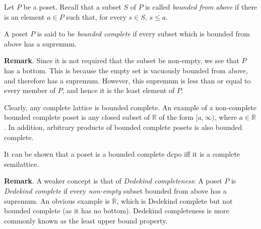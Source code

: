 \documentclass[12pt]{article}
\begin{document}
Let $P$ be a poset.  Recall that a subset $S$ of $P$ is called \emph{bounded from above} if there is an element $a\in P$ such that, for every $s\in S$, $s\le a$.

A poset $P$ is said to be \emph{bounded complete} if every subset which is bounded from above has a supremum.

\textbf{Remark}.  Since it is not required that the subset be non-empty, we see that $P$ has a bottom.  This is because the empty set is vacuously bounded from above, and therefore has a supremum.  However, this supremum is less than or equal to every member of $P$, and hence it is the least element of $P$. 

Clearly, any complete lattice is bounded complete.  An example of a non-complete bounded complete poset is any closed subset of $\mathbb{R}$ of the form $[a,\infty)$, where $a\in \mathbb{R}$.  In addition, arbitrary products of bounded complete posets is also bounded complete.  

It can be shown that a poset is a bounded complete dcpo iff it is a complete semilattice.

\textbf{Remark}.  A weaker concept is that of \emph{Dedekind completeness}: A poset $P$ is \emph{Dedekind complete} if every \emph{non-empty} subset bounded from above has a supremum.  An obvious example is $\mathbb{R}$, which is Dedekind complete but not bounded complete (as it has no bottom).  Dedekind completeness is more commonly known as the least upper bound property.
\end{document}
